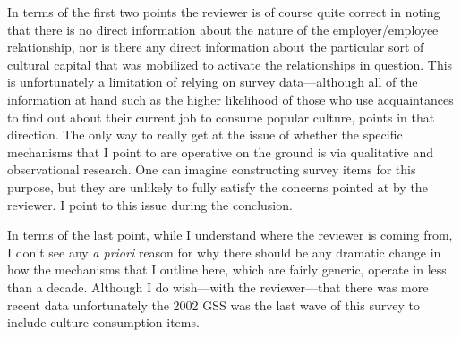 \documentclass[11pt]{article}
\begin{document}
\begin{enumerate}
In terms of the first two points the reviewer is of course quite correct in noting that there is no direct information about the nature of the employer/employee relationship, nor is there any direct information about the particular sort of cultural capital that was mobilized to activate the relationships in question.   This is unfortunately a limitation of relying on survey data---although all of the information at hand such as the higher likelihood of those who use acquaintances to find out about their current job to consume popular culture, points in that direction. The only way to really get at the issue of whether the specific mechanisms that I point to are operative on the ground is via qualitative and observational research. One can imagine constructing survey items for this purpose, but they are unlikely to fully satisfy the concerns pointed at by  the reviewer. I point to this issue during the conclusion.  

In terms of the last point, while I understand where the reviewer is coming from, I don't see any \emph{a priori} reason for why there should be any dramatic change in how the mechanisms that I outline here, which are fairly generic, operate in less than a decade.  Although I do wish---with the reviewer---that there was more recent data unfortunately the 2002 GSS was the last wave of this survey to include culture consumption items.
\end{enumerate}
\end{document}

